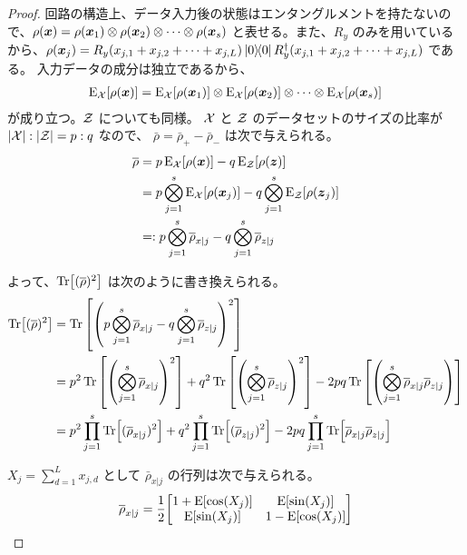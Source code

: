 \begin{proof}
    回路の構造上、データ入力後の状態はエンタングルメントを持たないので、$\rho(\boldsymbol{x}) = \rho(\boldsymbol{x}_1) \otimes \rho(\boldsymbol{x}_2) \otimes \cdots \otimes \rho(\boldsymbol{x}_s)$ と表せる。また、$R_y$ のみを用いているから、$\rho(\bs{x}_j) = R_y(x_{j,1} + x_{j,2} + \cdots + x_{j,L})\dyad{0}R_y\dg(x_{j,1} + x_{j,2} + \cdots + x_{j,L})$ である。
    入力データの成分は独立であるから、
    \begin{align}
        \operatorname{E}_{\mathcal{X}}[\rho(\boldsymbol{x})] = \operatorname{E}_{\mathcal{X}}[\rho(\boldsymbol{x}_1)] \otimes \operatorname{E}_{\mathcal{X}}[\rho(\boldsymbol{x}_2)] \otimes \cdots \otimes \operatorname{E}_{\mathcal{X}}[\rho(\boldsymbol{x}_s)]
    \end{align}
    が成り立つ。$\mathcal{Z}$ についても同様。
    $\mathcal{X}$ と $\mathcal{Z}$ のデータセットのサイズの比率が $|\mathcal{X}|:|\mathcal{Z}| = p:q$ なので、
    $\bar{\rho} = \bar{\rho}_+ - \bar{\rho}_-$ は次で与えられる。
    \begin{align}
        \overline{\rho}
        &= p\operatorname{E}_{\mathcal{X}}[\rho(\boldsymbol{x})] - q\operatorname{E}_{\mathcal{Z}}[\rho(\boldsymbol{z})]\\
        &= p\bigotimes_{j=1}^s \operatorname{E}_{\mathcal{X}}[\rho(\boldsymbol{x}_j)] - q\bigotimes_{j=1}^s \operatorname{E}_{\mathcal{Z}}[\rho(\boldsymbol{z}_j)]\\
        &=: p\bigotimes_{j=1}^s \overline{\rho}_{x|j} - q\bigotimes_{j=1}^s \overline{\rho}_{z|j}
    \end{align}
    
    よって、$\Tr[(\overline{\rho})^2]$ は次のように書き換えられる。
    \begin{align}
        \Tr[(\overline{\rho})^2]
        &= \Tr\qty[\qty(p\bigotimes_{j=1}^s \overline{\rho}_{x|j} - q\bigotimes_{j=1}^s \overline{\rho}_{z|j})^2]\\
        &= p^2\Tr\qty[\qty(\bigotimes_{j=1}^s \overline{\rho}_{x|j})^2] + q^2\Tr\qty[\qty(\bigotimes_{j=1}^s \overline{\rho}_{z|j})^2] - 2pq\Tr\qty[\qty(\bigotimes_{j=1}^s \overline{\rho}_{x|j}\overline{\rho}_{z|j})]\\
        &= p^2\prod_{j=1}^s\Tr[(\overline{\rho}_{x|j})^2] + q^2\prod_{j=1}^s\Tr[(\overline{\rho}_{z|j})^2] - 2pq\prod_{j=1}^s\Tr[\overline{\rho}_{x|j}\overline{\rho}_{z|j}]
    \end{align}
    
    $X_j = \sum_{d=1}^L x_{j,d}$ として $\bar{\rho}_{x|j}$ の行列は次で与えられる。
    \begin{align}
        \bar{\rho}_{x|j}
        = \frac12\mqty[1 + \E[\cos(X_j)] & \E[\sin(X_j)] \\
                        \E[\sin(X_j)] & 1 - \E[\cos(X_j)]]
    \end{align}
    

\end{proof}
